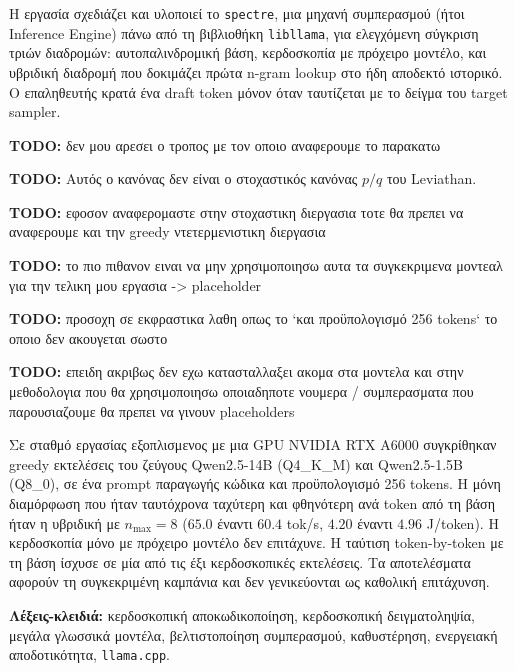 \documentclass[a4paper,12pt]{report}
\theoremstyle{plain}
\theoremstyle{definition}
\theoremstyle{remark}
\newcommand{\todo}[1]{%
  \par\smallskip
  {\sloppy\noindent\color{red!65!black}\textbf{TODO:} #1\par}%
\smallskip}
\begin{document}
Η εργασία σχεδιάζει και υλοποιεί το \texttt{spectre}, μια μηχανή
συμπερασμού (ήτοι Inference Engine) πάνω από τη βιβλιοθήκη
\texttt{libllama}, για ελεγχόμενη σύγκριση τριών διαδρομών:
αυτοπαλινδρομική βάση, κερδοσκοπία με πρόχειρο μοντέλο, και υβριδική
διαδρομή που δοκιμάζει πρώτα n-gram lookup στο ήδη αποδεκτό ιστορικό.
Ο επαληθευτής κρατά ένα draft token μόνον όταν ταυτίζεται με το
δείγμα του target sampler. \todo{δεν μου αρεσει ο τροπος με τον οποιο
αναφερουμε το παρακατω} \todo{Αυτός ο κανόνας δεν είναι ο στοχαστικός
κανόνας \(p/q\) του Leviathan.}

\todo{εφοσον αναφερομαστε στην στοχαστικη διεργασια τοτε θα πρεπει να
αναφερουμε και την greedy ντετερμενιστικη διεργασια}
\todo{το πιο πιθανον ειναι να μην χρησιμοποιησω αυτα τα συγκεκριμενα
μοντεαλ για την τελικη μου εργασια -> placeholder}
\todo{προσοχη σε εκφραστικα λαθη οπως το `και προϋπολογισμό 256
tokens` το οποιο δεν ακουγεται σωστο}
\todo{επειδη ακριβως δεν εχω κατασταλλαξει ακομα στα μοντελα και στην
  μεθοδολογια που θα χρησιμοποιησω οποιαδηποτε νουμερα / συμπερασματα
που παρουσιαζουμε θα πρεπει να γινουν placeholders}
Σε σταθμό εργασίας εξοπλισμενος με μια GPU NVIDIA RTX A6000
συγκρίθηκαν greedy εκτελέσεις του
ζεύγους Qwen2.5-14B (Q4\_K\_M) και Qwen2.5-1.5B (Q8\_0), σε ένα prompt
παραγωγής κώδικα και προϋπολογισμό 256 tokens. Η μόνη διαμόρφωση που ήταν
ταυτόχρονα ταχύτερη και φθηνότερη ανά token από τη βάση ήταν η υβριδική με
\(n_{\max}=8\) (\(65.0\) έναντι \(60.4\) tok/s, \(4.20\) έναντι \(4.96\)
J/token). Η κερδοσκοπία μόνο με πρόχειρο μοντέλο δεν επιτάχυνε. Η ταύτιση
token-by-token με τη βάση ίσχυσε σε μία από τις έξι κερδοσκοπικές εκτελέσεις.
Τα αποτελέσματα αφορούν τη συγκεκριμένη καμπάνια και δεν γενικεύονται ως
καθολική επιτάχυνση.

\vspace{1.5em}
\noindent\textbf{Λέξεις-κλειδιά:}
κερδοσκοπική αποκωδικοποίηση, κερδοσκοπική δειγματοληψία, μεγάλα γλωσσικά
μοντέλα, βελτιστοποίηση συμπερασμού, καθυστέρηση, ενεργειακή αποδοτικότητα,
\texttt{llama.cpp}.
\end{document}
